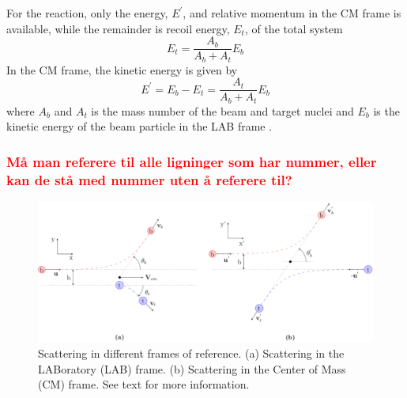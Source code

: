 \documentclass[twoside,english]{uiofysmaster/uiofysmaster}
\begin{document}
For the reaction, only the energy, $E^{'}$, and relative momentum in the CM frame is available, while the remainder is recoil energy, $E_t$, of the total system
\begin{equation}
	E_t = \frac{A_b}{A_b + A_t} E_b
\end{equation}
In the CM frame, the kinetic energy is given by
\begin{equation}
	E^{'} = E_b - E_t = \frac{A_t}{A_b + A_t} E_{b}
\end{equation}
where $A_b$ and $A_t$ is the mass number of the beam and target nuclei and $E_{b}$ is the kinetic energy of the beam particle in the LAB frame \cite{Niedermaier, NaR}.


\subsubsection*{\textcolor{red}{Må man referere til alle ligninger som har nummer, eller kan de stå med nummer uten å referere til?}}




\begin{figure}[htb]
	\centering
	\includegraphics[width=\textwidth]{Images/scattering.png}
	\caption{Scattering in different frames of reference.
	(a) Scattering in the LABoratory (LAB) frame. 
	(b) Scattering in the Center of Mass (CM) frame. 
	See text for more information.}
	\label{fig:scattering}
\end{figure}

%		
%		
\end{document}
